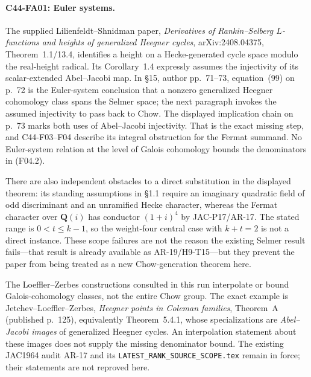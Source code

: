 \paragraph{C44-FA01: Euler systems.}
The supplied Lilienfeldt--Shnidman paper,
\emph{Derivatives of Rankin--Selberg $L$-functions and heights of
generalized Heegner cycles}, arXiv:2408.04375,
Theorem~1.1/13.4, identifies a height on a Hecke-generated cycle
space modulo the real-height radical.  Its Corollary~1.4 expressly
assumes the injectivity of its scalar-extended Abel--Jacobi map.
In \S15, author pp.~71--73, equation~(99) on p.~72 is the Euler-system
conclusion that a nonzero generalized Heegner cohomology class
spans the Selmer space; the next paragraph invokes the assumed
injectivity to pass back to Chow.  The displayed implication chain
on p.~73 marks both uses of Abel--Jacobi injectivity.  That is the exact missing
step, and C44-F03--F04 describe its integral obstruction for the
Fermat summand.  No Euler-system relation at the level of
Galois cohomology bounds the denominators in (F04.2).

There are also independent obstacles to a direct substitution
in the displayed theorem: its standing assumptions in \S1.1
require an imaginary quadratic field of odd discriminant and
an unramified Hecke character, whereas the Fermat character
over $\mathbf Q(i)$ has conductor $(1+i)^4$ by JAC-P17/AR-17.
The stated range is $0<t\le k-1$, so the weight-four central
case with $k+t=2$ is not a direct instance.  These scope failures
are not the reason the existing Selmer result fails---that result
is already available as AR-19/H9-T15---but they prevent the paper
from being treated as a new Chow-generation theorem here.

The Loeffler--Zerbes constructions consulted in this run
interpolate or bound Galois-cohomology classes, not the entire
Chow group.  The exact example is Jetchev--Loeffler--Zerbes,
\emph{Heegner points in Coleman families}, Theorem~A
(published p.~125), equivalently Theorem~5.4.1, whose
specializations are \emph{Abel--Jacobi images} of generalized
Heegner cycles.  An interpolation statement about these images
does not supply the missing denominator bound.  The existing
JAC1964 audit AR-17 and its
\texttt{LATEST\_RANK\_SOURCE\_SCOPE.tex} remain in force; their
statements are not reproved here.

